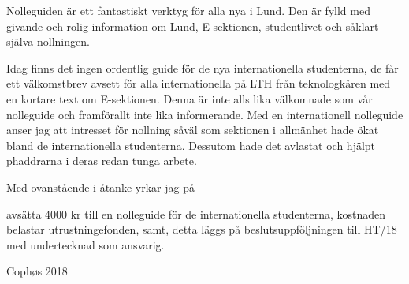 \documentclass[../_main/handlingar.tex]{subfiles}
\begin{document}

Nolleguiden är ett fantastiskt verktyg för alla nya i Lund. Den är fylld med givande och rolig information om Lund, E-sektionen, studentlivet och såklart själva nollningen.
 
Idag finns det ingen ordentlig guide för de nya internationella studenterna, de får ett välkomstbrev avsett för alla internationella på LTH från teknologkåren med en kortare text om E-sektionen. Denna är inte alls lika välkomnade som vår nolleguide och framförallt inte lika informerande. Med en internationell nolleguide anser jag att intresset för nollning såväl som sektionen i allmänhet hade ökat bland de internationella studenterna. Dessutom hade det avlastat och hjälpt phaddrarna i deras redan tunga arbete. 
 
Med ovanstående i åtanke yrkar jag på  


\begin{attsatser}
    \att avsätta 4000 kr till en nolleguide för de internationella studenterna, 
    \att kostnaden belastar utrustningefonden, samt,
    \att detta läggs på beslutsuppföljningen till HT/18 med undertecknad som ansvarig.
\end{attsatser}

\begin{signatures}{1}
    \mvh
    \signature{Edvard Carlsson}{Cophøs 2018}
\end{signatures}
\end{document}
